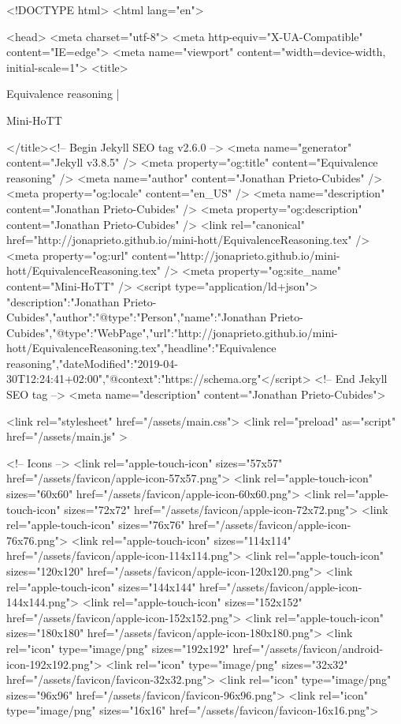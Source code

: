 <!DOCTYPE html>
<html lang="en">

<head>
  <meta charset="utf-8">
  <meta http-equiv="X-UA-Compatible" content="IE=edge">
  <meta name="viewport" content="width=device-width, initial-scale=1">
  <title>
    
      
        Equivalence reasoning |
      
        Mini-HoTT
    
  </title><!-- Begin Jekyll SEO tag v2.6.0 -->
<meta name="generator" content="Jekyll v3.8.5" />
<meta property="og:title" content="Equivalence reasoning" />
<meta name="author" content="Jonathan Prieto-Cubides" />
<meta property="og:locale" content="en_US" />
<meta name="description" content="Jonathan Prieto-Cubides" />
<meta property="og:description" content="Jonathan Prieto-Cubides" />
<link rel="canonical" href="http://jonaprieto.github.io/mini-hott/EquivalenceReasoning.tex" />
<meta property="og:url" content="http://jonaprieto.github.io/mini-hott/EquivalenceReasoning.tex" />
<meta property="og:site_name" content="Mini-HoTT" />
<script type="application/ld+json">
{"description":"Jonathan Prieto-Cubides","author":{"@type":"Person","name":"Jonathan Prieto-Cubides"},"@type":"WebPage","url":"http://jonaprieto.github.io/mini-hott/EquivalenceReasoning.tex","headline":"Equivalence reasoning","dateModified":"2019-04-30T12:24:41+02:00","@context":"https://schema.org"}</script>
<!-- End Jekyll SEO tag -->
<meta name="description" content="Jonathan Prieto-Cubides">

  <link rel="stylesheet" href="/assets/main.css">
  <link rel="preload" as="script" href="/assets/main.js" >

  <!-- Icons -->
  <link rel="apple-touch-icon" sizes="57x57" href="/assets/favicon/apple-icon-57x57.png">
  <link rel="apple-touch-icon" sizes="60x60" href="/assets/favicon/apple-icon-60x60.png">
  <link rel="apple-touch-icon" sizes="72x72" href="/assets/favicon/apple-icon-72x72.png">
  <link rel="apple-touch-icon" sizes="76x76" href="/assets/favicon/apple-icon-76x76.png">
  <link rel="apple-touch-icon" sizes="114x114" href="/assets/favicon/apple-icon-114x114.png">
  <link rel="apple-touch-icon" sizes="120x120" href="/assets/favicon/apple-icon-120x120.png">
  <link rel="apple-touch-icon" sizes="144x144" href="/assets/favicon/apple-icon-144x144.png">
  <link rel="apple-touch-icon" sizes="152x152" href="/assets/favicon/apple-icon-152x152.png">
  <link rel="apple-touch-icon" sizes="180x180" href="/assets/favicon/apple-icon-180x180.png">
  <link rel="icon" type="image/png" sizes="192x192"  href="/assets/favicon/android-icon-192x192.png">
  <link rel="icon" type="image/png" sizes="32x32" href="/assets/favicon/favicon-32x32.png">
  <link rel="icon" type="image/png" sizes="96x96" href="/assets/favicon/favicon-96x96.png">
  <link rel="icon" type="image/png" sizes="16x16" href="/assets/favicon/favicon-16x16.png">

